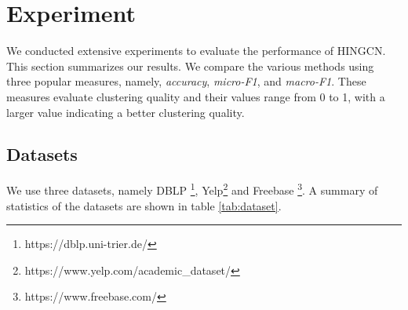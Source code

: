 \section{Experiment}
\label{sec:exp}
We conducted extensive experiments
to evaluate the performance of HINGCN.
This section summarizes our results. 
We compare the various methods using three popular measures, 
namely, \emph{accuracy}, \emph{micro-F1}, and \emph{macro-F1}.
These measures evaluate clustering quality and their values range from 0 to 1, 
with a larger value indicating a better
clustering quality. 

\subsection{Datasets}
We use three datasets, namely DBLP \footnote{https://dblp.uni-trier.de/}, Yelp\footnote{https://www.yelp.com/academic{\_}dataset/} and Freebase \footnote{https://www.freebase.com/}. A summary of statistics of the datasets are shown in table \ref{tab:dataset}.

